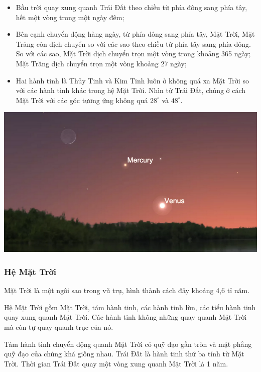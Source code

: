 \begin{minipage}[l]{0.6\textwidth}
	\begin{itemize}
		\item Bầu trời quay xung quanh Trái Đất theo chiều từ phía đông sang phía tây, hết một vòng trong một ngày đêm;
		\item Bên cạnh chuyển động hàng ngày, từ phía đông sang phía tây, Mặt Trời, Mặt Trăng còn dịch chuyển so với các sao theo chiều từ phía tây sang phía đông. So với các sao, Mặt Trời dịch chuyển trọn một vòng trong khoảng 365 ngày; Mặt Trăng dịch chuyển trọn một vòng khoảng 27 ngày;
		\item Hai hành tinh là Thủy Tinh và Kim Tinh luôn ở không quá xa Mặt Trời so với các hành tinh khác trong hệ Mặt Trời. Nhìn từ Trái Đất, chúng ở cách Mặt Trời với các góc tương ứng không quá $28^\circ$ và $48^\circ$.
	\end{itemize}
\end{minipage}
\begin{minipage}[r]{0.4\textwidth}
	\begin{center}
		\includegraphics[scale=0.4]{../figs/G10-034-1.png}
	\end{center}
\end{minipage}

\subsubsection{Hệ Mặt Trời}

Mặt Trời là một ngôi sao trong vũ trụ, hình thành cách đây khoảng 4,6 tỉ năm.

Hệ Mặt Trời gồm Mặt Trời, tám hành tinh, các hành tinh lùn, các tiểu hành tinh quay xung quanh Mặt Trời. Các hành tinh không những quay quanh Mặt Trời mà còn tự quay quanh trục của nó.

Tám hành tinh chuyển động quanh Mặt Trời có quỹ đạo gần tròn và mặt phẳng quỹ đạo của chúng khá giống nhau. Trái Đất là hành tinh thứ ba tính từ Mặt Trời. Thời gian Trái Đất quay một vòng xung quanh Mặt Trời là 1 năm.

